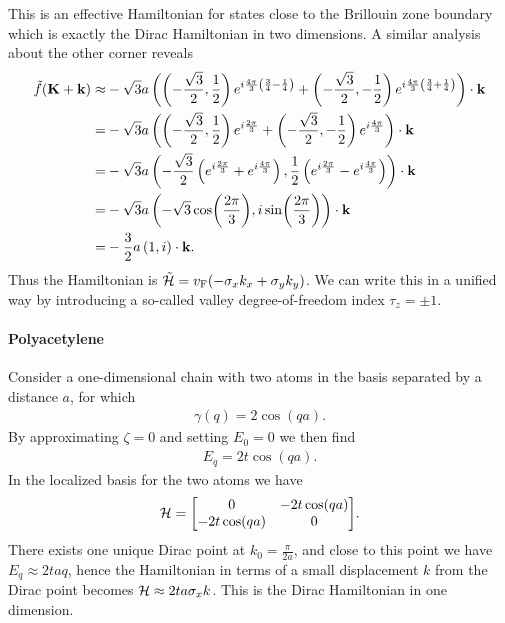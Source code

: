 This is an effective Hamiltonian for states close to the Brillouin zone boundary which is exactly the Dirac Hamiltonian in two dimensions. A similar analysis about the other corner reveals
\begin{align*}
	\tilde{f}(\vb{K} + \vb{k}) \approx& -\sqrt{3}a\left(\left(-\frac{\sqrt{3}}{2}, \frac{1}{2}\right)e^{i\frac{4\pi}{3}\left(\frac{3}{4} - \frac{1}{4}\right)} + \left(-\frac{\sqrt{3}}{2}, -\frac{1}{2}\right)e^{i\frac{4\pi}{3}\left(\frac{3}{4} + \frac{1}{4}\right)}\right)\cdot\vb{k} \\
	                                 =& -\sqrt{3}a\left(\left(-\frac{\sqrt{3}}{2}, \frac{1}{2}\right)e^{i\frac{2\pi}{3}} + \left(-\frac{\sqrt{3}}{2}, -\frac{1}{2}\right)e^{i\frac{4\pi}{3}}\right)\cdot\vb{k} \\
	                                 =& -\sqrt{3}a\left(-\frac{\sqrt{3}}{2}\left(e^{i\frac{2\pi}{3}} + e^{i\frac{4\pi}{3}}\right), \frac{1}{2}\left(e^{i\frac{2\pi}{3}} - e^{i\frac{4\pi}{3}}\right)\right)\cdot\vb{k} \\
	                                 =& -\sqrt{3}a\left(-\sqrt{3}\cos(\frac{2\pi}{3}), i\sin(\frac{2\pi}{3})\right)\cdot\vb{k} \\
	                                 =& -\frac{3}{2}a\left(1, i\right)\cdot\vb{k}.
\end{align*}
Thus the Hamiltonian is $\tilde{\mathcal{H}} = v_{\text{F}}(-\sigma_{x}k_{x} + \sigma_{y}k_{y})$. We can write this in a unified way by introducing a so-called valley degree-of-freedom index $\tau_{z} = \pm 1$.

\paragraph{Polyacetylene}
Consider a one-dimensional chain with two atoms in the basis separated by a distance $a$, for which
\begin{align*}
	\gamma(q) = 2\cos(qa).
\end{align*}
By approximating $\zeta = 0$ and setting $E_{0} = 0$ we then find
\begin{align*}
	E_{q} = 2t\cos(qa).
\end{align*}
In the localized basis for the two atoms we have
\begin{align*}
	\ham = \mqty[
		0          & -2t\cos(qa) \\
		-2t\cos(qa) & 0
	].
\end{align*}
There exists one unique Dirac point at $k_{0} = \frac{\pi}{2a}$, and close to this point we have $E_{q} \approx 2taq$, hence the Hamiltonian in terms of a small displacement $k$ from the Dirac point becomes $\mathcal{H} \approx 2ta\sigma_{x}k$. This is the Dirac Hamiltonian in one dimension.

